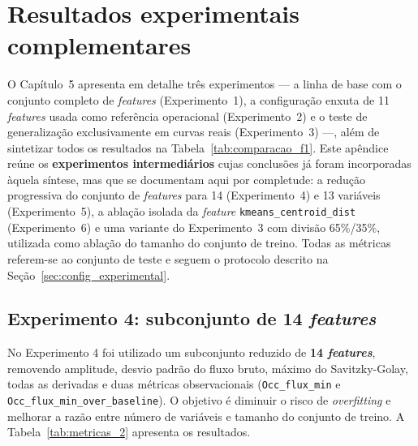 \documentclass[msc]{on} %
\begin{document}
\appendix
\chapter{Resultados experimentais complementares}
\label{ap:experimentos}

O Capítulo~5 apresenta em detalhe três experimentos --- a linha de base com o conjunto completo de \textit{features} (Experimento~1), a configuração enxuta de 11 \textit{features} usada como referência operacional (Experimento~2) e o teste de generalização exclusivamente em curvas reais (Experimento~3) ---, além de sintetizar todos os resultados na Tabela~\ref{tab:comparacao_f1}. Este apêndice reúne os \textbf{experimentos intermediários} cujas conclusões já foram incorporadas àquela síntese, mas que se documentam aqui por completude: a redução progressiva do conjunto de \textit{features} para 14 (Experimento~4) e 13 variáveis (Experimento~5), a ablação isolada da \textit{feature} \texttt{kmeans\_centroid\_dist} (Experimento~6) e uma variante do Experimento~3 com divisão 65\%/35\%, utilizada como ablação do tamanho do conjunto de treino. Todas as métricas referem-se ao conjunto de teste e seguem o protocolo descrito na Seção~\ref{sec:config_experimental}.

\section{Experimento 4: subconjunto de 14 \textit{features}}
\label{sec:resultados_exp2}

No Experimento 4 foi utilizado um subconjunto reduzido de \textbf{14 \textit{features}}, removendo amplitude, desvio padrão do fluxo bruto, máximo do Savitzky-Golay, todas as derivadas e duas métricas observacionais (\texttt{Occ\_flux\_min} e \texttt{Occ\_flux\_min\_over\_baseline}). O objetivo é diminuir o risco de \textit{overfitting} e melhorar a razão entre número de variáveis e tamanho do conjunto de treino. A Tabela~\ref{tab:metricas_2} apresenta os resultados.
\end{document}
